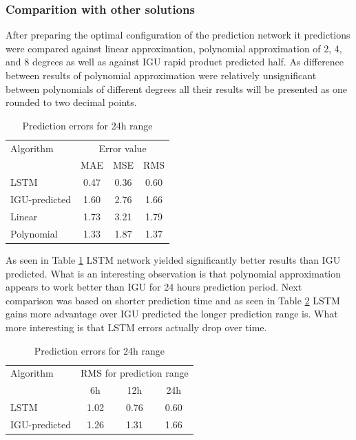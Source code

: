 \documentclass{article}
\begin{document}
\subsubsection{Comparition with other solutions}
After preparing the optimal configuration of the prediction network it predictions were compared against
linear approximation, polynomial approximation of 2, 4, and 8 degrees as well as against IGU rapid
product predicted half.
As difference between results of polynomial approximation were relatively unsignificant between
polynomials of different degrees all their results will be presented as one rounded to
two decimal points.
\begin{table}[htb] 
	\centering
	\caption{Prediction errors for 24h range}
	\label{tab:comparition_1}
	\begin{tabular}{lccc}
		\hline
		\hline
		Algorithm& \multicolumn{3}{c}{Error value}  \\
		& MAE& MSE& RMS\\
		\hline
		LSTM& 0.47& 0.36& 0.60  \\
		IGU-predicted& 1.60& 2.76& 1.66  \\
		Linear& 1.73& 3.21& 1.79  \\
		Polynomial& 1.33& 1.87& 1.37  \\
		\hline
		\hline
	\end{tabular}
\end{table}
As seen in Table \ref{tab:comparition_1} LSTM network yielded significantly better results than
IGU predicted. What is an interesting observation is that polynomial approximation appears to work
better than IGU for 24 hours prediction period.
Next comparison was based on shorter prediction time and as seen in Table \ref{tab:comparition_2}
LSTM gains more advantage over IGU predicted the longer prediction range is.
What more interesting is that LSTM errors actually drop over time.
\begin{table}[htb] 
	\centering
	\caption{Prediction errors for 24h range}
	\label{tab:comparition_2}
	\begin{tabular}{lccc}
		\hline
		\hline
		Algorithm& \multicolumn{3}{c}{RMS for prediction range}  \\
		& 6h& 12h& 24h\\
		\hline
		LSTM& 1.02& 0.76& 0.60  \\
		IGU-predicted& 1.26& 1.31& 1.66  \\
		\hline
		\hline
	\end{tabular}
\end{table}
\end{document}
